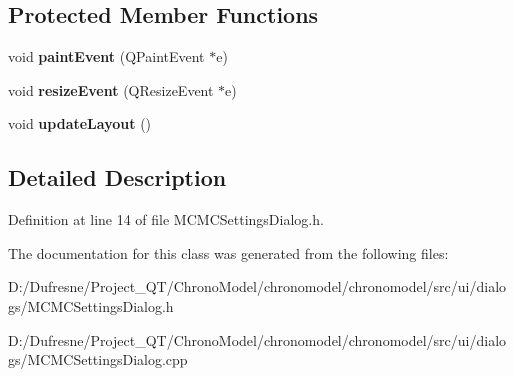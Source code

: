 \subsection*{Protected Member Functions}
\begin{DoxyCompactItemize}
\item 
\hypertarget{class_m_c_m_c_settings_dialog_a2697c4576ebef6bc40642fc87bd36c0c}{void {\bfseries paint\-Event} (Q\-Paint\-Event $\ast$e)}\label{class_m_c_m_c_settings_dialog_a2697c4576ebef6bc40642fc87bd36c0c}

\item 
\hypertarget{class_m_c_m_c_settings_dialog_acdc69dbc82c7294fd8a1934a12da0849}{void {\bfseries resize\-Event} (Q\-Resize\-Event $\ast$e)}\label{class_m_c_m_c_settings_dialog_acdc69dbc82c7294fd8a1934a12da0849}

\item 
\hypertarget{class_m_c_m_c_settings_dialog_a5cc362e8c08f90453b2748c21b377c07}{void {\bfseries update\-Layout} ()}\label{class_m_c_m_c_settings_dialog_a5cc362e8c08f90453b2748c21b377c07}

\end{DoxyCompactItemize}


\subsection{Detailed Description}


Definition at line 14 of file M\-C\-M\-C\-Settings\-Dialog.\-h.



The documentation for this class was generated from the following files\-:\begin{DoxyCompactItemize}
\item 
D\-:/\-Dufresne/\-Project\-\_\-\-Q\-T/\-Chrono\-Model/chronomodel/chronomodel/src/ui/dialogs/M\-C\-M\-C\-Settings\-Dialog.\-h\item 
D\-:/\-Dufresne/\-Project\-\_\-\-Q\-T/\-Chrono\-Model/chronomodel/chronomodel/src/ui/dialogs/M\-C\-M\-C\-Settings\-Dialog.\-cpp\end{DoxyCompactItemize}
